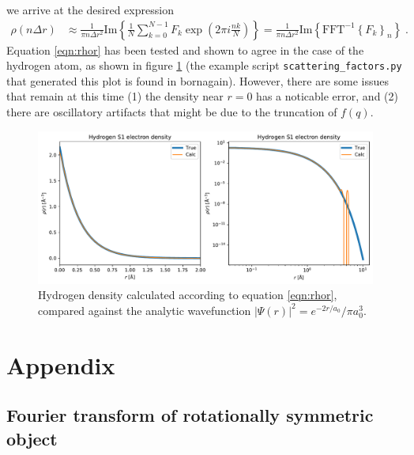 \documentclass[11pt]{article}
\begin{document}
we arrive at the desired expression
\begin{align}\label{eqn:rhor}
\rho(n \Delta r) &\approx \frac{1}{\pi n \Delta r^2 } \text{Im} \left\{ \frac{1}{N}  \sum_{k=0}^{N-1}    F_k  \exp\left( 2\pi i \frac{nk}{ N} \right) \right\} = \frac{1}{\pi n \Delta r^2 } \text{Im}\left\{ \text{FFT}^{-1}\left\{ F_k \right\}_n\right\} \; .
\end{align}
Equation \ref{eqn:rhor} has been tested and shown to agree in the case of the hydrogen atom, as shown in figure \ref{fig:hydrogen} (the example script \texttt{scattering\_factors.py} that generated this plot is found in bornagain).  However, there are some issues that remain at this time (1) the density near $r=0$ has a noticable error, and (2) there are oscillatory artifacts that might be due to the truncation of $f(q)$.

\begin{figure}[htbp]
   \centering
   \includegraphics[width=\textwidth]{figures/hydrogen_density_1.pdf} 
   \caption{Hydrogen density calculated according to equation \ref{eqn:rhor}, compared against the analytic wavefunction $|\Psi(r)|^2=e^{-2 r/a_0}/\pi a_0^3$.}
   \label{fig:hydrogen}
\end{figure}

\section{Appendix}

\subsection{Fourier transform of rotationally symmetric object}
\label{sec:3d1d}
\end{document}

